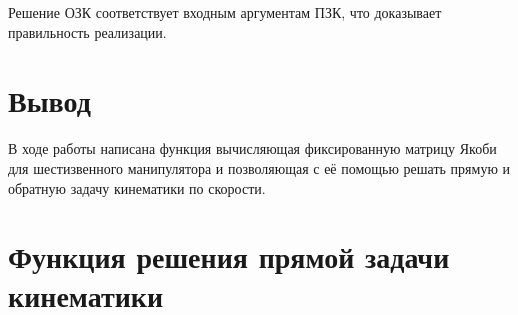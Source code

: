 \documentclass[14pt]{extarticle}
\begin{document}
    Решение ОЗК соответствует входным аргументам ПЗК, что доказывает правильность реализации.

    \section*{Вывод}
    В ходе работы написана функция вычисляющая фиксированную матрицу Якоби для шестизвенного манипулятора и позволяющая
    с её помощью решать прямую и обратную задачу кинематики по скорости.

    \appendix \newpage
    \renewcommand{\thesection}{\Asbuk{section}}
    \section{Функция решения прямой задачи кинематики}\label{code:jacob}
\end{document}
